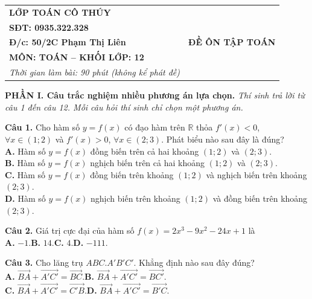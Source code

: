 \documentclass[12pt,a4paper]{article}
\begin{document}
\noindent
\begin{tabular}{|p{8.5cm}|p{8.5cm}|}
\hline
\centering \textbf{\large LỚP TOÁN CÔ THÚY} \tabularnewline
\centering \textbf{SĐT: 0935.322.328} \tabularnewline
\centering \textbf{Đ/c: 50/2C Phạm Thị Liên} &
\centering \textbf{\large ĐỀ ÔN TẬP TOÁN} \tabularnewline
\centering \textbf{MÔN: TOÁN -- KHỐI LỚP: 12} \tabularnewline
\centering \textit{Thời gian làm bài: 90 phút (không kể phát đề)} \tabularnewline
\hline
\end{tabular}

\vspace{0.1cm}
\noindent \hfill {}

\vspace{0.25cm}
\noindent\textbf{\large PHẦN I. Câu trắc nghiệm nhiều phương án lựa chọn.} \textit{Thí sinh trả lời từ câu 1 đến câu 12. Mỗi câu hỏi thí sinh chỉ chọn một phương án.}

\vspace{0.15cm}
\textbf{Câu 1.} Cho hàm số $y = f(x)$ có đạo hàm trên $\mathbb{R}$ thỏa $f'(x) < 0$, $\forall x \in (1; 2)$ và $f'(x) > 0$, $\forall x \in (2; 3)$. Phát biểu nào sau đây là đúng?\\
\textbf{A.} Hàm số $y = f(x)$ đồng biến trên cả hai khoảng $(1; 2)$ và $(2; 3)$.\\
\textbf{B.} Hàm số $y = f(x)$ nghịch biến trên cả hai khoảng $(1; 2)$ và $(2; 3)$.\\
\textbf{C.} Hàm số $y = f(x)$ đồng biến trên khoảng $(1; 2)$ và nghịch biến trên khoảng $(2; 3)$.\\
\textbf{D.} Hàm số $y = f(x)$ nghịch biến trên khoảng $(1; 2)$ và đồng biến trên khoảng $(2; 3)$.

\vspace{0.15cm}
\textbf{Câu 2.} Giá trị cực đại của hàm số $f(x) = 2x^3 - 9x^2 - 24x + 1$ là\\
\textbf{A.} $-1$.\TAB\textbf{B.} $14$.\TAB\textbf{C.} $4$.\TAB\textbf{D.} $-111$.

\vspace{0.15cm}
\textbf{Câu 3.} Cho lăng trụ $ABC.A'B'C'$. Khẳng định nào sau đây đúng?\\
\textbf{A.} $\overrightarrow{BA} + \overrightarrow{A'C'} = \overrightarrow{BC}$.\TAB\textbf{B.} $\overrightarrow{BA} + \overrightarrow{A'C'} = \overrightarrow{BC'}$.\\
\textbf{C.} $\overrightarrow{BA} + \overrightarrow{A'C'} = \overrightarrow{C'B}$.\TAB\textbf{D.} $\overrightarrow{BA} + \overrightarrow{A'C'} = \overrightarrow{B'C}$.
\end{document}
